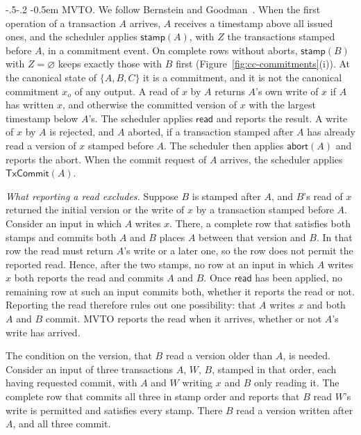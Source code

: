 \documentclass[sigconf]{cidr-2027}
\makeatletter
\theoremstyle{remark}
\renewcommand\paragraph{\@startsection{paragraph}{4}{\z@}%
  {-.5\baselineskip \@plus -2\p@ \@minus -.2\p@}%
  {-0.5em}%
  {\normalfont\bfseries}}
\newcommand{\commitment}{commitment\xspace}
\makeatother
\begin{document}
\paragraph{MVTO.}
We follow Bernstein and Goodman~\cite{bernstein1981concurrency}. When the
first operation of a transaction $A$ arrives, $A$ receives a timestamp above
all issued ones, and the scheduler applies $\mathsf{stamp}(A)$, with $Z$ the
transactions stamped before $A$, in a \commitment event. On complete rows
without aborts, $\mathsf{stamp}(B)$ with $Z=\varnothing$ keeps exactly those
with $B$ first (Figure~\ref{fig:cc-commitments}(i)). At the canonical state
of $\{A,B,C\}$ it is a \commitment, and it is not the canonical \commitment
$x_o$ of any output. A read of $x$ by $A$ returns $A$'s own write of $x$ if
$A$ has written $x$, and otherwise the committed version of $x$ with the
largest timestamp below $A$'s. The scheduler applies $\mathsf{read}$ and
reports the result. A write of $x$ by $A$ is rejected, and $A$ aborted, if a
transaction stamped after $A$ has already read a version of $x$ stamped before
$A$. The scheduler then applies $\mathsf{abort}(A)$ and reports the abort. When the commit request of $A$ arrives, the scheduler applies
$\mathsf{TxCommit}(A)$.

\emph{What reporting a read excludes.}  Suppose $B$ is stamped after $A$, and
$B$'s read of $x$ returned the initial version or the write of $x$ by a
transaction stamped before $A$. Consider an input in which $A$ writes $x$. There, a complete row that satisfies both stamps and commits both $A$ and $B$
places $A$ between that version and $B$. In that row the read must return
$A$'s write or a later one, so the row does not permit the reported read. Hence, after the two stamps, no row at an input in which $A$ writes $x$ both
reports the read and commits $A$ and $B$. Once $\mathsf{read}$ has been
applied, no remaining row at such an input commits both, whether it reports
the read or not. Reporting the read therefore rules out one possibility: that
$A$ writes $x$ and both $A$ and $B$ commit. MVTO reports the read when it
arrives, whether or not $A$'s write has arrived.

The condition on the version, that $B$ read a version older than $A$, is
needed. Consider an input of three transactions $A$, $W$, $B$, stamped in
that order, each having requested commit, with $A$ and $W$ writing $x$ and $B$
only reading it. The complete row that commits all three in stamp order and
reports that $B$ read $W$'s write is permitted and satisfies every stamp. There $B$ read a version written after $A$, and all three commit.
\end{document}
